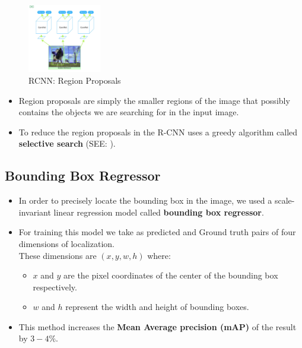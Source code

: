 \begin{table}[H]
    \begin{minipage}[t]{0.49\linewidth}
        \begin{figure}[H]
            \centering
            \includegraphics[width=\linewidth, height=3cm, keepaspectratio]{Pictures/convolutional-neural-network/rcnn-region-proposals.jpg}
            \caption{RCNN: Region Proposals}
        \end{figure}        
    \end{minipage}
    \hfill
    \begin{minipage}[t]{0.49\linewidth}
        \begin{itemize}
            \item Region proposals are simply the smaller regions of the image that possibly contains the objects we are searching for in the input image.
        
            \item To reduce the region proposals in the R-CNN uses a greedy algorithm called \textbf{selective search} (SEE: ).
        \end{itemize}
    \end{minipage}
\end{table}


\subsection{Bounding Box Regressor \cite{https://www.geeksforgeeks.org/r-cnn-region-based-cnns/}}\label{Bounding Box Regressor}

\begin{itemize}
    \item In order to precisely locate the bounding box in the image, we used a scale-invariant linear regression model called \textbf{bounding box regressor}.

    \item For training this model we take as predicted and Ground truth pairs of four dimensions of localization.\\
    These dimensions are $(x, y, w, h)$ where:
    \begin{itemize}
        \item $x$ and $y$ are the pixel coordinates of the center of the bounding box respectively. 

        \item $w$ and $h$ represent the width and height of bounding boxes.
    \end{itemize}
    
    \item This method increases the \textbf{Mean Average precision (mAP)} of the result by $3-4\%$.
    
\end{itemize}



